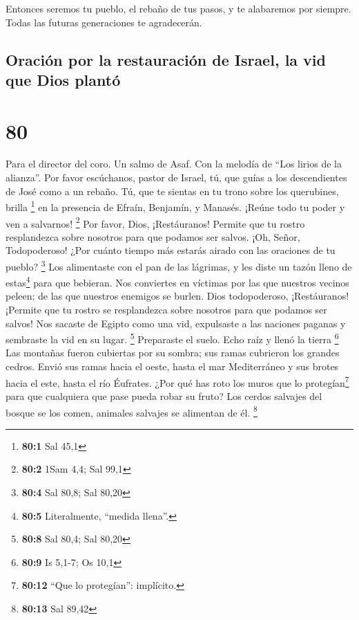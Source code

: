  Entonces seremos tu pueblo, el rebaño de tus pasos, y te
alabaremos por siempre. Todas las futuras generaciones te agradecerán.

\hypertarget{oraciuxf3n-por-la-restauraciuxf3n-de-israel-la-vid-que-dios-plantuxf3}{%
\subsection{Oración por la restauración de Israel, la vid que Dios
plantó}\label{oraciuxf3n-por-la-restauraciuxf3n-de-israel-la-vid-que-dios-plantuxf3}}

\hypertarget{section-79}{%
\section{80}\label{section-79}}

Para el director del coro. Un salmo de Asaf. Con la melodía de ``Los
lirios de la alianza''.  Por favor escúchanos, pastor de
Israel, tú, que guías a los descendientes de José como a un rebaño. Tú,
que te sientas en tu trono sobre los querubines, brilla \footnote{\textbf{80:1}
  Sal 45,1}  en la presencia de Efraín, Benjamín, y
Manasés. ¡Reúne todo tu poder y ven a salvarnos! \footnote{\textbf{80:2}
  1Sam 4,4; Sal 99,1}  Por favor, Dios, ¡Restáuranos!
Permite que tu rostro resplandezca sobre nosotros para que podamos ser
salvos.  ¡Oh, Señor, Todopoderoso! ¿Por cuánto tiempo más
estarás airado con las oraciones de tu pueblo? \footnote{\textbf{80:4}
  Sal 80,8; Sal 80,20}  Los alimentaste con el pan de las
lágrimas, y les diste un tazón lleno de estas\footnote{\textbf{80:5}
  Literalmente, ``medida llena''.} para que bebieran.  Nos
conviertes en víctimas por las que nuestros vecinos peleen; de las que
nuestros enemigos se burlen.  Dios todopoderoso,
¡Restáuranos! ¡Permite que tu rostro se resplandezca sobre nosotros para
que podamos ser salvos!  Nos sacaste de Egipto como una
vid, expulsaste a las naciones paganas y sembraste la vid en su lugar.
\footnote{\textbf{80:8} Sal 80,4; Sal 80,20}  Preparaste
el suelo. Echo raíz y llenó la tierra \footnote{\textbf{80:9} Is 5,1-7;
  Os 10,1}  Las montañas fueron cubiertas por su sombra;
sus ramas cubrieron los grandes cedros.  Envió sus ramas
hacia el oeste, hasta el mar Mediterráneo y sus brotes hacia el este,
hasta el río Éufrates.  ¿Por qué has roto los muros que
lo protegían\footnote{\textbf{80:12} ``Que lo protegían'': implícito.}
para que cualquiera que pase pueda robar su fruto?  Los
cerdos salvajes del bosque se los comen, animales salvajes se alimentan
de él. \footnote{\textbf{80:13} Sal 89,42}

